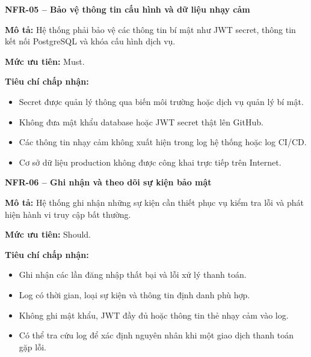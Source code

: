 \documentclass[a4paper]{article}
\begin{document}
\par\ifdim\dimexpr\pagegoal-\pagetotal\relax<6\baselineskip\newpage\fi
{}

\noindent\textbf{NFR-05 – Bảo vệ thông tin cấu hình và dữ liệu nhạy cảm}\par\nopagebreak
\begin{list}{}{%
    \setlength{\leftmargin}{0.8cm}%
    \setlength{\rightmargin}{0pt}%
    \setlength{\labelwidth}{0pt}%
    \setlength{\labelsep}{0pt}%
    \setlength{\itemindent}{0pt}%
    \setlength{\listparindent}{0pt}%
    \setlength{\itemsep}{5pt}%
    \setlength{\parsep}{0pt}%
    \setlength{\topsep}{5pt}%
}
\item[] \textbf{Mô tả:} Hệ thống phải bảo vệ các thông tin bí mật như JWT secret, thông tin kết nối PostgreSQL và khóa cấu hình dịch vụ.
\item[] \textbf{Mức ưu tiên:} Must.
\item[] \textbf{Tiêu chí chấp nhận:} 
\begin{itemize}
\item Secret được quản lý thông qua biến môi trường hoặc dịch vụ quản lý bí mật.
\item Không đưa mật khẩu database hoặc JWT secret thật lên GitHub.
\item Các thông tin nhạy cảm không xuất hiện trong log hệ thống hoặc log CI/CD.
\item Cơ sở dữ liệu production không được công khai trực tiếp trên Internet.
\end{itemize}
\end{list}

\par\ifdim\dimexpr\pagegoal-\pagetotal\relax<6\baselineskip\newpage\fi
{}

\noindent\textbf{NFR-06 – Ghi nhận và theo dõi sự kiện bảo mật}\par\nopagebreak
\begin{list}{}{%
    \setlength{\leftmargin}{0.8cm}%
    \setlength{\rightmargin}{0pt}%
    \setlength{\labelwidth}{0pt}%
    \setlength{\labelsep}{0pt}%
    \setlength{\itemindent}{0pt}%
    \setlength{\listparindent}{0pt}%
    \setlength{\itemsep}{5pt}%
    \setlength{\parsep}{0pt}%
    \setlength{\topsep}{5pt}%
}
\item[] \textbf{Mô tả:} Hệ thống ghi nhận những sự kiện cần thiết phục vụ kiểm tra lỗi và phát hiện hành vi truy cập bất thường.
\item[] \textbf{Mức ưu tiên:} Should.
\item[] \textbf{Tiêu chí chấp nhận:} 
\begin{itemize}
\item Ghi nhận các lần đăng nhập thất bại và lỗi xử lý thanh toán.
\item Log có thời gian, loại sự kiện và thông tin định danh phù hợp.
\item Không ghi mật khẩu, JWT đầy đủ hoặc thông tin thẻ nhạy cảm vào log.
\item Có thể tra cứu log để xác định nguyên nhân khi một giao dịch thanh toán gặp lỗi.
\end{itemize}
\end{list}
\end{document}
